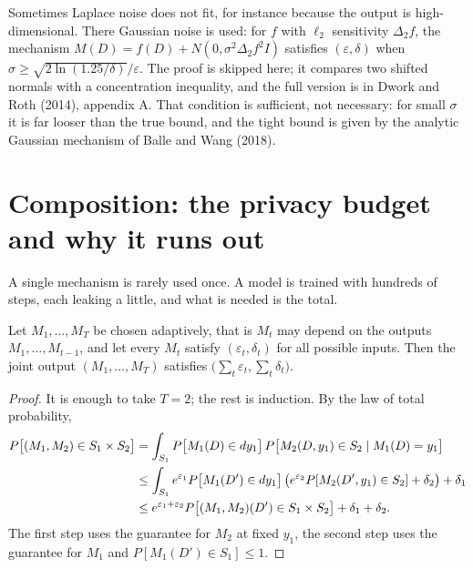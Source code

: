 
Sometimes Laplace noise does not fit, for instance because the output is
high-dimensional. There Gaussian noise is used: for $f$ with $\ell_2$ sensitivity
$\Delta_2 f$, the mechanism $M(D)=f(D)+N(0,\sigma^{2}\Delta_2 f^{2}I)$ satisfies
$(\varepsilon,\delta)$ when $\sigma\ge\sqrt{2\ln(1.25/\delta)}/\varepsilon$. The proof is
skipped here; it compares two shifted normals with a concentration inequality, and the
full version is in Dwork and Roth (2014), appendix A. That condition is sufficient, not
necessary: for small $\sigma$ it is far looser than the true bound, and the tight bound
is given by the analytic Gaussian mechanism of Balle and Wang (2018).

\section{Composition: the privacy budget and why it runs out}

A single mechanism is rarely used once. A model is trained with hundreds of steps, each
leaking a little, and what is needed is the total.

\begin{teorema}
Let $M_1,\dots,M_T$ be chosen adaptively, that is $M_t$ may depend on the outputs
$M_1,\dots,M_{t-1}$, and let every $M_t$ satisfy $(\varepsilon_t,\delta_t)$ for all
possible inputs. Then the joint output $(M_1,\dots,M_T)$ satisfies
$\bigl(\sum_t\varepsilon_t,\sum_t\delta_t\bigr)$.
\end{teorema}

\begin{proof}
It is enough to take $T=2$; the rest is induction. By the law of total probability,
\begin{align}
P\bigl[(M_1,M_2)\in S_1\times S_2\bigr]
&= \int_{S_1} P\bigl[M_1(D)\in dy_1\bigr]\,
   P\bigl[M_2(D,y_1)\in S_2 \mid M_1(D)=y_1\bigr] \notag\\
&\le \int_{S_1} e^{\varepsilon_1}P\bigl[M_1(D')\in dy_1\bigr]\,
   \bigl(e^{\varepsilon_2}P[M_2(D',y_1)\in S_2]+\delta_2\bigr) + \delta_1 \notag\\
&\le e^{\varepsilon_1+\varepsilon_2}P\bigl[(M_1,M_2)(D')\in S_1\times S_2\bigr]
   + \delta_1 + \delta_2 .
\end{align}
The first step uses the guarantee for $M_2$ at fixed $y_1$, the second step uses the
guarantee for $M_1$ and $P[M_1(D')\in S_1]\le 1$.
\end{proof}

